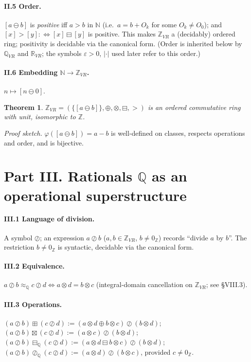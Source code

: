 \documentclass[11pt]{article}
\newtheorem{theorem}{Theorem}
\theoremstyle{definition}
\newcommand{\Obj}{O}
\newcommand{\Z}{\mathbb{Z}}
\newcommand{\Q}{\mathbb{Q}}
\newcommand{\R}{\mathbb{R}}
\newcommand{\N}{\mathbb{N}}
\newcommand{\isub}{\ominus}              %
\newcommand{\fdiv}{\oslash}              %
\begin{document}
\paragraph{II.5 Order.} $[a\isub b]$ is \emph{positive} iff $a>b$ in $\N$ (i.e.\ $a=b+\Obj_k$ for some
$\Obj_k\neq\Obj_0$); and $[x]>[y] :\Leftrightarrow [x]\boxminus[y]$ is positive. This makes
$\Z_{VR}$ a (decidably) ordered ring; positivity is decidable via the canonical form. (Order is
inherited below by $\Q_{VR}$ and $\R_{VR}$; the symbols $\varepsilon>0$, $|\cdot|$ used later
refer to this order.)

\paragraph{II.6 Embedding $\N\to\Z_{VR}$.} $n\mapsto[n\isub 0]$.

\begin{theorem}
$\Z_{VR}=(\{[a\isub b]\},\oplus,\otimes,\boxminus,>)$ is an ordered commutative ring with unit,
isomorphic to $\Z$.
\end{theorem}
\emph{Proof sketch.} $\varphi([a\isub b])=a-b$ is well-defined on classes, respects operations and
order, and is bijective.

\section*{Part III. Rationals $\Q$ as an operational superstructure}

\paragraph{III.1 Language of division.} A symbol $\fdiv$; an expression $a\fdiv b$
($a,b\in\Z_{VR}$, $b\neq 0_{\Z}$) records ``divide $a$ by $b$''. The restriction $b\neq 0_{\Z}$ is
syntactic, decidable via the canonical form.

\paragraph{III.2 Equivalence.} $a\fdiv b \approx_{\Q} c\fdiv d \Leftrightarrow a\otimes d = b\otimes c$
(integral-domain cancellation on $\Z_{VR}$; see \S VIII.3).

\paragraph{III.3 Operations.}
$(a\fdiv b)\boxplus(c\fdiv d):=(a\otimes d\oplus b\otimes c)\fdiv(b\otimes d)$;\quad
$(a\fdiv b)\boxtimes(c\fdiv d):=(a\otimes c)\fdiv(b\otimes d)$;\quad
$(a\fdiv b)\boxminus_{\Q}(c\fdiv d):=(a\otimes d\boxminus b\otimes c)\fdiv(b\otimes d)$;\quad
$(a\fdiv b)\oslash_{\Q}(c\fdiv d):=(a\otimes d)\fdiv(b\otimes c)$, provided $c\neq 0_{\Z}$.
\end{document}

